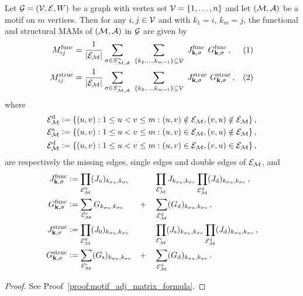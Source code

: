 \begin{proposition} \label{prop:motif_adj_matrix_formula}
Let $\mathcal{G} = (\mathcal{V,E},W)$ be a graph with vertex set ${\mathcal{V}=\{1,\ldots,n\}}$ and let $(\mathcal{M,A})$ be a motif on $m$ vertices. Then for any $i,j \in \mathcal{V}$ and with $k_1 = i$, $k_m = j$, the functional and structural MAMs of $\mathcal{(M,A)}$ in $\mathcal{G}$ are given by
%
%
\begin{align*}
M^\mathrm{func}_{ij} &= \frac{1}{|\mathcal{E_M}|} \sum_{\sigma \in S_{\mathcal{M,A}}^\sim} \ \sum_{\{k_2, \ldots, k_{m-1}\} \subseteq \mathcal{V}} \ J^\mathrm{func}_{\mathbf{k},\sigma} \ G^\mathrm{func}_{\mathbf{k},\sigma}\,, &(1) \\
M^\mathrm{struc}_{ij} &= \frac{1}{|\mathcal{E_M}|} \sum_{\sigma \in S_{\mathcal{M,A}}^\sim} \ \sum_{\{k_2, \ldots, k_{m-1}\} \subseteq \mathcal{V}} \ J^\mathrm{struc}_{\mathbf{k},\sigma} \ G^\mathrm{struc}_{\mathbf{k},\sigma}\,, &(2) 
\end{align*}
%
where
%
\begin{align*}
	\mathcal{E}_{\mathcal{M}}^0 &\vcentcolon= \{ (u,v) : 1 \leq u < v \leq m : (u,v) \notin \mathcal{E_M}, (v,u) \notin \mathcal{E_M} \}\,, \\
	\mathcal{E}_{\mathcal{M}}^\mathrm{s} &\vcentcolon= \{ (u,v) : 1 \leq u < v \leq m : (u,v) \in \mathcal{E_M}, (v,u) \notin \mathcal{E_M} \}\,, \\
	\mathcal{E}_{\mathcal{M}}^\mathrm{d} &\vcentcolon= \{ (u,v) : 1 \leq u < v \leq m : (u,v) \in \mathcal{E_M}, (v,u) \in \mathcal{E_M} \}\,,
\end{align*}
%
are respectively the missing edges, single edges and double edges of $\mathcal{E_M}$, and
%
\begin{alignat*}{3}
%
	J^\mathrm{func}_{\mathbf{k},\sigma}
	& \vcentcolon= \prod_{\ca{E}_\ca{M}^0} (J_\mathrm{n})_{k_{\sigma u},k_{\sigma v}}
	&& && \prod_{\ca{E}_\ca{M}^\mathrm{s}} J_{k_{\sigma u},k_{\sigma v}}
	\prod_{\ca{E}_\ca{M}^\mathrm{d}} (J_\mathrm{d})_{k_{\sigma u},k_{\sigma v}}\,, \\
%
	G^\mathrm{func}_{\mathbf{k},\sigma}
	& \vcentcolon= \sum_{\ca{E}_\ca{M}^\mathrm{s}} G_{k_{\sigma u},k_{\sigma v}}
	&& + && \sum_{\ca{E}_\ca{M}^\mathrm{d}} (G_\mathrm{d})_{k_{\sigma u},k_{\sigma v}}\,, \\
%
	J^\mathrm{struc}_{\mathbf{k},\sigma}
	& \vcentcolon= \prod_{\ca{E}_\ca{M}^0} (J_0)_{k_{\sigma u},k_{\sigma v}}
	&& && \prod_{\ca{E}_\ca{M}^\mathrm{s}} (J_\mathrm{s})_{k_{\sigma u},k_{\sigma v}}
	\prod_{\ca{E}_\ca{M}^\mathrm{d}} (J_\mathrm{d})_{k_{\sigma u},k_{\sigma v}}\,, \\
%
	G^\mathrm{struc}_{\mathbf{k},\sigma}
	&\vcentcolon= \sum_{\ca{E}_\ca{M}^\mathrm{s}} (G_\mathrm{s})_{k_{\sigma u},k_{\sigma v}}
	&& + && \sum_{\ca{E}_\ca{M}^\mathrm{d}} (G_\mathrm{d})_{k_{\sigma u},k_{\sigma v}}\,. 
%
\end{alignat*}
\end{proposition}
%
\begin{proof}
See Proof~\ref{proof:motif_adj_matrix_formula}.
\end{proof}




